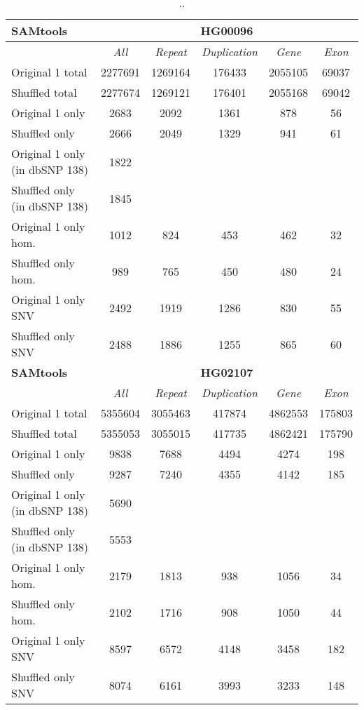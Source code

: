 \begin{table}[htb]
\caption{ .. }
\begin{center}
\begin{tabular}{|l|c||c|c|c|c|}
\hline
{\bf SAMtools} & \multicolumn{5}{|c|}{\bf HG00096} \\
\hline
\cline{2-6}
{\bf} & {\it All} & {\it Repeat} & {\it Duplication} & {\it Gene} & {\it Exon} \\
\hline
Original 1 total & 2277691 & 1269164 & 176433 & 2055105 & 69037\\ 
\hline
Shuffled total & 2277674 & 1269121 & 176401 & 2055168 & 69042\\ 
\hline
Original 1 only & 2683 & 2092 & 1361 & 878 & 56\\ 
\hline
Shuffled only & 2666 & 2049 & 1329 & 941 & 61\\ 
\hline
Original 1 only (in dbSNP 138) & 1822 &  &  &  & \\ 
\hline
Shuffled only (in dbSNP 138) & 1845 &  &  &  & \\ 
\hline
Original 1 only hom. & 1012 & 824 & 453 & 462 & 32\\ 
\hline
Shuffled only hom. & 989 & 765 & 450 & 480 & 24\\ 
\hline
Original 1 only SNV & 2492 & 1919 & 1286 & 830 & 55\\ 
\hline
Shuffled only SNV & 2488 & 1886 & 1255 & 865 & 60\\ 
\hline
\hline
{\bf SAMtools} & \multicolumn{5}{|c|}{\bf HG02107} \\
\hline
\cline{2-6}
{\bf} & {\it All} & {\it Repeat} & {\it Duplication} & {\it Gene} & {\it Exon} \\
\hline
Original 1 total & 5355604 & 3055463 & 417874 & 4862553 & 175803\\ 
\hline
Shuffled total & 5355053 & 3055015 & 417735 & 4862421 & 175790\\ 
\hline
Original 1 only & 9838 & 7688 & 4494 & 4274 & 198\\ 
\hline
Shuffled only & 9287 & 7240 & 4355 & 4142 & 185\\ 
\hline
Original 1 only (in dbSNP 138) & 5690 &  &  &  & \\ 
\hline
Shuffled only (in dbSNP 138) & 5553 &  &  &  & \\ 
\hline
Original 1 only hom. & 2179 & 1813 & 938 & 1056 & 34\\ 
\hline
Shuffled only hom. & 2102 & 1716 & 908 & 1050 & 44\\ 
\hline
Original 1 only SNV & 8597 & 6572 & 4148 & 3458 & 182\\ 
\hline
Shuffled only SNV & 8074 & 6161 & 3993 & 3233 & 148\\ 
\hline
\end{tabular}
\end{center}
\label{tab:orig-vs-shuf-samtools}
\end{table}

